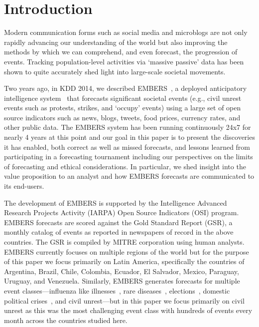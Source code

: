 \section{Introduction}
Modern communication forms such as social media and microblogs are not only rapidly
advancing our understanding of the world but also improving the methods by which we can
comprehend, and even forecast, the progression of events.
Tracking population-level activities via `massive passive' data has been shown to
quite accurately shed light into large-scale societal movements.

Two years ago, in KDD 2014, we described EMBERS~\cite{kdd:beating-the-news}, a deployed anticipatory
intelligence system~\cite{bigdata-andy-doyle-embers-paper} that forecasts significant
societal events (e.g., civil unrest
events such as protests, strikes, and `occupy' events) using a large set of open source
indicators such as news, blogs, tweets, food prices, currency rates, and other public
data. The EMBERS system has been running continuously 24x7 for nearly 4 years at this point
and our goal in this paper is to present the discoveries it has enabled,
both correct as well as missed
forecasts, and lessons learned from participating in a forecasting tournament including
our perspectives on the limits of forecasting and ethical considerations. In
particular, we shed insight into the value proposition to an analyst and how EMBERS forecasts
are communicated to its end-users.

The development of EMBERS is supported by the Intelligence Advanced Research Projects
Activity (IARPA) Open Source Indicators (OSI) program.
EMBERS forecasts are scored against the Gold Standard Report (GSR), a monthly catalog of
events as reported in newspapers of record in the above countries. The GSR is compiled by MITRE corporation
using human analysts.
EMBERS currently focuses on multiple regions of the world but for the purpose of this paper
we focus primarily on Latin America, specifically the countries of
Argentina, Brazil, Chile, Colombia, Ecuador, El Salvador, Mexico, Paraguay, Uruguay, and Venezuela.
Similarly, EMBERS generates forecasts for multiple event classes---influenza like illnesses~\cite{prithwish-ili},
rare diseases~\cite{sdm-saurav}, elections~\cite{aravindan-wei-besc}, domestic political crises~\cite{gdelt-acm-webscience}, and civil unrest---but in this paper we focus primarily on civil unrest as this was the
most challenging event class with hundreds of events every month across the countries studied here.

